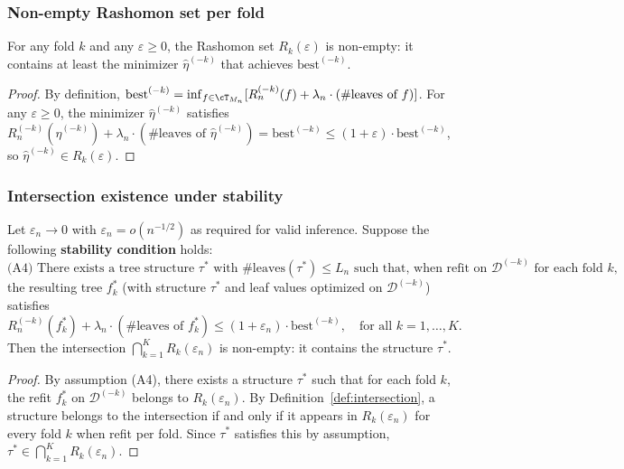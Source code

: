 \documentclass[12pt]{article}
\begin{document}
\subsubsection{Non-empty Rashomon set per fold}

\begin{lemma}
\label{lem:rashomon-nonempty}
For any fold $k$ and any $\varepsilon \ge 0$, the Rashomon set $R_k(\varepsilon)$ is non-empty: it contains at least the minimizer $\hat\eta^{(-k)}$ that achieves $\text{best}^{(-k)}$.
\end{lemma}
\begin{proof}
By definition, $\text{best}^{(-k)} = \inf_{f \in \cT_{M_n}} [ R_n^{(-k)}(f) + \lambda_n \cdot (\#\text{leaves of } f) ]$. For any $\varepsilon \ge 0$, the minimizer $\hat\eta^{(-k)}$ satisfies $R_n^{(-k)}(\hat\eta^{(-k)}) + \lambda_n \cdot (\#\text{leaves of } \hat\eta^{(-k)}) = \text{best}^{(-k)} \le (1+\varepsilon) \cdot \text{best}^{(-k)}$, so $\hat\eta^{(-k)} \in R_k(\varepsilon)$.
\end{proof}

\subsubsection{Intersection existence under stability}

\begin{theorem}
\label{thm:intersection-existence}
Let $\varepsilon_n \to 0$ with $\varepsilon_n = o(n^{-1/2})$ as required for valid inference. Suppose the following \textbf{stability condition} holds:
\begin{equation}
\label{eq:stability}
\text{(A4) There exists a tree structure } \tau^* \text{ with } \#\text{leaves}(\tau^*) \le L_n \text{ such that, when refit on } \mathcal{D}^{(-k)} \text{ for each fold } k,
\end{equation}
the resulting tree $f_k^*$ (with structure $\tau^*$ and leaf values optimized on $\mathcal{D}^{(-k)}$) satisfies
\[
R_n^{(-k)}(f_k^*) + \lambda_n \cdot (\#\text{leaves of } f_k^*) \le (1+\varepsilon_n) \cdot \text{best}^{(-k)}, \quad \text{for all } k = 1, \ldots, K.
\]
Then the intersection $\bigcap_{k=1}^K R_k(\varepsilon_n)$ is non-empty: it contains the structure $\tau^*$.
\end{theorem}

\begin{proof}
By assumption (A4), there exists a structure $\tau^*$ such that for each fold $k$, the refit $f_k^*$ on $\mathcal{D}^{(-k)}$ belongs to $R_k(\varepsilon_n)$. By Definition~\ref{def:intersection}, a structure belongs to the intersection if and only if it appears in $R_k(\varepsilon_n)$ for every fold $k$ when refit per fold. Since $\tau^*$ satisfies this by assumption, $\tau^* \in \bigcap_{k=1}^K R_k(\varepsilon_n)$.
\end{proof}
\end{document}
